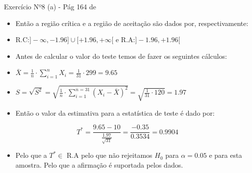 \documentclass[10,5pt, pdf]{beamer}
\begin{document}
\begin{frame}{Exercício Nº8 (a) - Pág 164 de \cite{reis2021}}
\begin{itemize}
\item{Então a região crítica e a região de aceitação são dados por, respectivamente:}
\pause
\item{R.C:$]-\infty, -1.96]\cup [+1.96, +\infty[$ e R.A:$]-1.96 , +1.96[$}
\pause
\item{Antes de calcular o valor do teste temos de fazer os seguintes cálculos:}
\pause
\item{$\bar{X}=\frac{1}{n}\cdot\sum_{i=1}^{n}X_i=\frac{1}{31}\cdot299=9.65$}
\pause
\item{$S=\sqrt{S^2}=\sqrt{\frac{1}{n}\cdot\sum_{i=1}^{n=31}(X_i-\bar{X})^2}=\sqrt{\frac{1}{31}\cdot120}=1.97$}
\pause
\item{Então o valor da estimativa para a estatística de teste é dado por:}
\pause
\end{itemize}
\begin{equation}
T^*=\frac{9.65-10}{\frac{1.97}{\sqrt{31}}}=\frac{-0.35}{0.3534}=0.9904    
\end{equation}
\begin{itemize}
    \item{Pelo que a $T^*\in$ R.A pelo que não rejeitamos $H_0$ para $\alpha=0.05$ e para esta amostra. Pelo que a afirmação é suportada pelos dados.} 
\end{itemize}
\end{frame}
\end{document}
